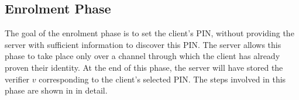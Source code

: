 \documentclass[runningheads]{llncs}
\renewcommand{\verifier}{\ensuremath{{v}}}
\begin{document}
\vspace{-3mm}
\subsection{Enrolment Phase}
\label{sec:enrollment}



The goal of the enrolment phase is to set the client's PIN, without providing the  
 server with sufficient information to discover this PIN. The server allows this phase to take place only over a channel through which the client has already proven their identity.  At the end of this phase, the server will have stored the verifier $\verifier$ corresponding to the client's selected PIN.
The steps involved in this phase are shown in  in detail.  
\end{document}
